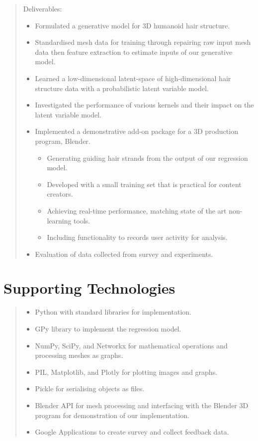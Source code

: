 \documentclass[ %
author={Dillon Keith Diep},
supervisor={Dr. Carl Henrik Ek},
degree={MEng},
title={ART-CG Hair:},
subtitle={Assisted Real-time Content Generation of Stylised Virtual Hair},
type={Research},
year={2017} ]{dissertation}
\begin{document}
\begin{quote}
	Deliverables:
	\begin{itemize}
		\item Formulated a generative model for 3D humanoid hair structure.
		\item Standardised mesh data for training through repairing raw input mesh data then feature extraction to estimate inputs of our generative model.
		\item Learned a low-dimensional latent-space of high-dimensional hair structure data with a probabilistic latent variable model.
		\item Investigated the performance of various kernels and their impact on the latent variable model.
		\item Implemented a demonstrative add-on package for a 3D production program, Blender.
		\begin{itemize}
			\item Generating guiding hair strands from the output of our regression model.
			\item Developed with a small training set that is practical for content creators.
			\item Achieving real-time performance, matching state of the art non-learning tools.
			\item Including functionality to records user activity for analysis.
		\end{itemize}
		\item Evaluation of data collected from survey and experiments.
	\end{itemize}
\end{quote}


\chapter*{Supporting Technologies}

\begin{quote}
	\noindent
	\begin{itemize}
		\item Python with standard libraries for implementation.
		\item GPy library to implement the regression model.
		\item NumPy, SciPy, and Networkx for mathematical operations and processing meshes as graphs.
		\item PIL, Matplotlib, and Plotly for plotting images and graphs.
		\item Pickle for serialising objects as files.
		\item Blender API for mesh processing and interfacing with the Blender 3D program for demonstration of our implementation.
		\item Google Applications to create survey and collect feedback data.
	\end{itemize}
\end{quote}
\end{document}
